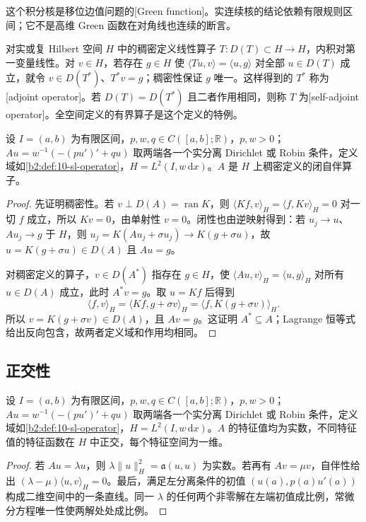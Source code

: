 这个积分核是移位边值问题的[Green function]。实连续核的结论依赖有限规则区间；它不是高维 Green 函数在对角线也连续的断言。

\ProseParagraphBreak

对实或复 Hilbert 空间 \(H\) 中的稠密定义线性算子 \(T:D(T)\subset H\to H\)，内积对第一变量线性。对 \(v\in H\)，若存在 \(g\in H\) 使 \(\langle Tu,v\rangle=\langle u,g\rangle\) 对全部 \(u\in D(T)\) 成立，就令 \(v\in D(T^*)\)、\(T^*v=g\)；稠密性保证 \(g\) 唯一。这样得到的 \(T^*\) 称为[adjoint operator]。若 \(D(T)=D(T^*)\) 且二者作用相同，则称 \(T\) 为[self-adjoint operator]。全空间定义的有界算子是这个定义的特例。

\begin{theorem}\label{b2:thm:10-self-adjoint}
设 \(I=(a,b)\) 为有限区间，\(p,w,q\in C([a,b];\mathbb R)\)，\(p,w>0\)；\(Au=w^{-1}(-(pu')'+qu)\) 取两端各一个实分离 Dirichlet 或 Robin 条件，定义域如\cref{b2:def:10-sl-operator}，\(H=L^2(I,w\,\mathrm dx)\)。\(A\) 是 \(H\) 上稠密定义的闭自伴算子。
\end{theorem}
\begin{proof}
先证明稠密性。若 \(v\perp D(A)=\operatorname{ran}K\)，则 \(\langle Kf,v\rangle_H=\langle f,Kv\rangle_H=0\) 对一切 \(f\) 成立，所以 \(Kv=0\)，由单射性 \(v=0\)。闭性也由逆映射得到：若 \(u_j\to u\)、\(Au_j\to g\) 于 \(H\)，则 \(u_j=K(Au_j+\sigma u_j)\to K(g+\sigma u)\)，故 \(u=K(g+\sigma u)\in D(A)\) 且 \(Au=g\)。

对稠密定义的算子，\(v\in D(A^*)\) 指存在 \(g\in H\)，使 \(\langle Au,v\rangle_H=\langle u,g\rangle_H\) 对所有 \(u\in D(A)\) 成立，此时 \(A^*v=g\)。取 \(u=Kf\) 后得到
\[
 \langle f,v\rangle_H
 =\langle Kf,g+\sigma v\rangle_H
 =\langle f,K(g+\sigma v)\rangle_H.
\]
所以 \(v=K(g+\sigma v)\in D(A)\)，且 \(Av=g\)。这证明 \(A^*\subseteq A\)；Lagrange 恒等式给出反向包含，故两者定义域和作用均相同。
\end{proof}

\subsection{正交性}
\label{b2:subsec:100203}

\begin{proposition}\label{b2:prop:10-real-orthogonal-simple}
设 \(I=(a,b)\) 为有限区间，\(p,w,q\in C([a,b];\mathbb R)\)，\(p,w>0\)；\(Au=w^{-1}(-(pu')'+qu)\) 取两端各一个实分离 Dirichlet 或 Robin 条件，定义域如\cref{b2:def:10-sl-operator}，\(H=L^2(I,w\,\mathrm dx)\)。\(A\) 的特征值均为实数，不同特征值的特征函数在 \(H\) 中正交，每个特征空间为一维。
\end{proposition}
\begin{proof}
若 \(Au=\lambda u\)，则 \(\lambda\|u\|_H^2=\mathfrak a(u,u)\) 为实数。若再有 \(Av=\mu v\)，自伴性给出 \((\lambda-\mu)\langle u,v\rangle_H=0\)。最后，满足左分离条件的初值 \((u(a),p(a)u'(a))\) 构成二维空间中的一条直线。同一 \(\lambda\) 的任何两个非零解在左端初值成比例，常微分方程唯一性使两解处处成比例。
\end{proof}

